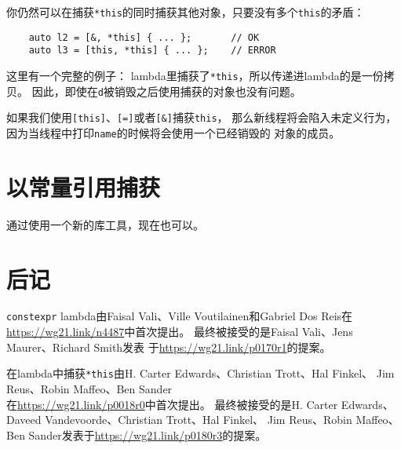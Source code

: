 你仍然可以在捕获\texttt{*this}的同时捕获其他对象，只要没有多个\texttt{this}的矛盾：
\begin{lstlisting}
    auto l2 = [&, *this] { ... };       // OK
    auto l3 = [this, *this] { ... };    // ERROR
\end{lstlisting}
这里有一个完整的例子：
lambda里捕获了\texttt{*this}，所以传递进lambda的是一份拷贝。
因此，即使在\texttt{d}被销毁之后使用捕获的对象也没有问题。

如果我们使用\texttt{[this]}、\texttt{[=]}或者\texttt{[\&]}捕获\texttt{this}，
那么新线程将会陷入未定义行为，因为当线程中打印\texttt{name}的时候将会使用一个已经销毁的
对象的成员。


\section{以常量引用捕获}
通过使用一个新的库工具，现在也可以。


\section{后记}
\texttt{constexpr} lambda由Faisal Vali、Ville Voutilainen和Gabriel Dos Reis在
\url{https://wg21.link/n4487}中首次提出。
最终被接受的是Faisal Vali、Jens Maurer、Richard Smith发表
于\url{https://wg21.link/p0170r1}的提案。

在lambda中捕获\texttt{*this}由H. Carter Edwards、Christian Trott、Hal Finkel、
Jim Reus、Robin Maffeo、Ben Sander\\
在\url{https://wg21.link/p0018r0}中首次提出。
最终被接受的是H. Carter Edwards、Daveed Vandevoorde、Christian Trott、Hal Finkel、
Jim Reus、Robin Maffeo、Ben Sander发表于\url{https://wg21.link/p0180r3}的提案。